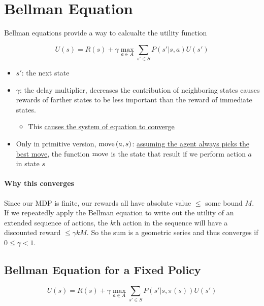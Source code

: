 \section{Bellman Equation}

  Bellman equations provide a way to calcualte the utility function

  \begin{equation}
    U\left( s \right)
      = R\left( s \right)
      + \gamma \max_{a \in A} \sum_{s' \in S}
      P\left( s' | s, a \right)
      U\left( s' \right)
  \end{equation}

  \begin{itemize}
    \item $ s' $: the next state
    \item $ \gamma $: the delay multiplier, decreases the contribution of
    neighboring states causes rewards of farther states to be less important
    than the reward of immediate states.
    \begin{itemize}
      \item This \ul{causes the system of equation to converge}
    \end{itemize}

    \item Only in primitive version, $ \operatorname{move}\left( a, s \right) $:
    \ul{assuming the agent always picks the best move}, the function
    $ \operatorname{move} $ is the state that result if we perform action $ a $ in state $ s $
  \end{itemize}

  \paragraph{Why this converges}

  Since our MDP is finite, our rewards all have absolute value $ \le $
  some bound $ M $. If we repeatedly apply the Bellman equation to write out
  the utility of an extended sequence of actions, the $ k $th action in
  the sequence will have a discounted reward $ \le \gamma kM $.
  So the sum is a geometric series and thus converges if $ 0 \le \gamma < 1 $.

  \subsection{Bellman Equation for a Fixed Policy}

    \begin{equation}
      U\left( s \right)
        = R\left( s \right)
        + \gamma \max_{a \in A} \sum_{s' \in S}
        P\left( s' | s, \pi\left( s \right) \right)
        U\left( s' \right)
    \end{equation}